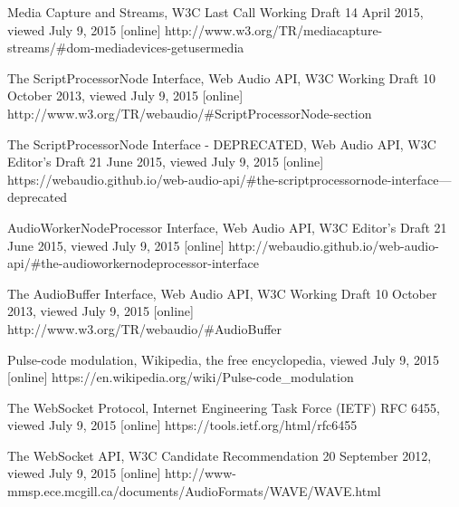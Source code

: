 \begin{thebibliography}{99}

Media Capture and Streams, W3C Last Call Working Draft 14 April 2015, viewed July 9, 2015 [online]
http://www.w3.org/TR/mediacapture-streams/\#dom-mediadevices-getusermedia

The ScriptProcessorNode Interface, Web Audio API, W3C Working Draft 10 October 2013, viewed July 9, 2015 [online]
http://www.w3.org/TR/webaudio/\#ScriptProcessorNode-section

The ScriptProcessorNode Interface - DEPRECATED, Web Audio API, W3C Editor's Draft 21 June 2015, viewed July 9, 2015 [online]
https://webaudio.github.io/web-audio-api/\#the-scriptprocessornode-interface---deprecated

AudioWorkerNodeProcessor Interface, Web Audio API, W3C Editor's Draft 21 June 2015, viewed July 9, 2015 [online]
http://webaudio.github.io/web-audio-api/\#the-audioworkernodeprocessor-interface	

The AudioBuffer Interface, Web Audio API, W3C Working Draft 10 October 2013, viewed July 9, 2015 [online]
http://www.w3.org/TR/webaudio/\#AudioBuffer

Pulse-code modulation, Wikipedia, the free encyclopedia, viewed July 9, 2015 [online]
https://en.wikipedia.org/wiki/Pulse-code\_modulation

The WebSocket Protocol, Internet Engineering Task Force (IETF) RFC 6455, viewed July 9, 2015 [online]
https://tools.ietf.org/html/rfc6455

The WebSocket API, W3C Candidate Recommendation 20 September 2012, viewed July 9, 2015 [online]
http://www-mmsp.ece.mcgill.ca/documents/AudioFormats/WAVE/WAVE.html

\end{thebibliography}
